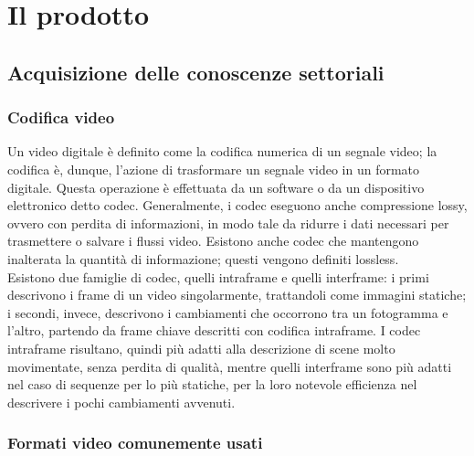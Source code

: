 \chapter{Il prodotto\label{cap:ilprodotto}}
\section{Acquisizione delle conoscenze settoriali}
	\subsection{Codifica video}
	Un video digitale è definito come la codifica numerica di un segnale video; la codifica è, dunque, l'azione di trasformare un segnale video in un formato digitale. Questa operazione è effettuata da un software o da un dispositivo elettronico detto codec. Generalmente, i codec eseguono anche compressione lossy, ovvero con perdita di informazioni, in modo tale da ridurre i dati necessari per trasmettere o salvare i flussi video. Esistono anche codec che mantengono inalterata la quantità di informazione; questi vengono definiti lossless.
	\\
	Esistono due famiglie di codec, quelli intraframe e quelli interframe:
	i primi descrivono i frame di un video singolarmente, trattandoli come immagini statiche; i secondi, invece, descrivono i cambiamenti che occorrono tra un fotogramma e l'altro, partendo da frame chiave descritti con codifica intraframe. I codec intraframe risultano, quindi più adatti alla descrizione di scene molto movimentate, senza perdita di qualità, mentre quelli interframe sono più adatti nel caso di sequenze per lo più statiche, per la loro notevole efficienza nel descrivere i pochi cambiamenti avvenuti.

	\subsection{Formati video comunemente usati}
